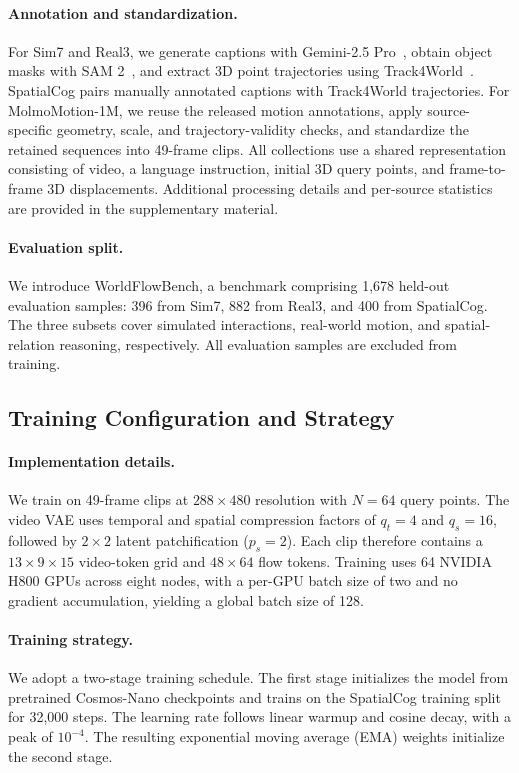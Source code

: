 \paragraph{Annotation and standardization.}
For Sim7 and Real3, we generate captions with
Gemini-2.5 Pro~\citep{comanici2025gemini}, obtain object
masks with SAM 2~\citep{ravi2024sam2}, and extract 3D
point trajectories using Track4World~\citep{lu2026track4world}.
SpatialCog pairs manually annotated captions with
Track4World trajectories.
For MolmoMotion-1M, we reuse the released motion
annotations, apply source-specific geometry, scale,
and trajectory-validity checks, and standardize the
retained sequences into 49-frame clips.
All collections use a shared representation consisting
of video, a language instruction, initial 3D query points,
and frame-to-frame 3D displacements.
Additional processing details and per-source statistics
are provided in the supplementary material.

\paragraph{Evaluation split.}
We introduce WorldFlowBench, a benchmark comprising
1,678 held-out evaluation samples: 396 from Sim7,
882 from Real3, and 400 from SpatialCog.
The three subsets cover simulated interactions,
real-world motion, and spatial-relation reasoning,
respectively.
All evaluation samples are excluded from training.

\subsection{Training Configuration and Strategy}

\paragraph{Implementation details.}
We train on 49-frame clips at $288\times480$ resolution
with $N=64$ query points.
The video VAE uses temporal and spatial compression
factors of $q_t=4$ and $q_s=16$, followed by
$2\times2$ latent patchification ($p_s=2$).
Each clip therefore contains a $13\times9\times15$
video-token grid and $48\times64$ flow tokens.
Training uses 64 NVIDIA H800 GPUs across eight nodes,
with a per-GPU batch size of two and no gradient
accumulation, yielding a global batch size of 128.

\paragraph{Training strategy.}
We adopt a two-stage training schedule.
The first stage initializes the model from pretrained
Cosmos-Nano checkpoints and trains on the SpatialCog
training split for 32,000 steps.
The learning rate follows linear warmup and cosine decay,
with a peak of $10^{-4}$.
The resulting exponential moving average (EMA) weights
initialize the second stage.

